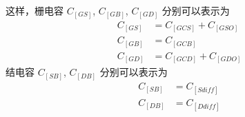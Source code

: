这样，栅电容 $C_[GS]$, $C_[GB]$, $C_[GD]$ 分别可以表示为
\begin{equation}
    \begin{aligned}
        C_[GS] &= C_[GCS] + C_[GSO] \\
        C_[GB] &= C_[GCB] \\
        C_[GD] &= C_[GCD] + C_[GDO]
    \end{aligned}
\end{equation}
结电容 $C_[SB]$, $C_[DB]$ 分别可以表示为
\begin{equation}
    \begin{aligned}
        C_[SB] &= C_[Sdiff] \\
        C_[DB] &= C_[Ddiff]
    \end{aligned}
\end{equation}

